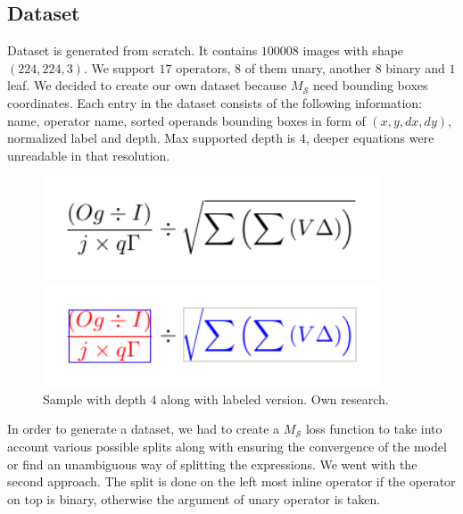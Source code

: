 \documentclass{sciposter}
\begin{document}
\begin{multicols}{3}
\subsection{Dataset}
Dataset is generated from scratch. It contains $100008$ images with shape $(224,224,3)$. We support $17$ operators, $8$ of them unary, another $8$ binary and $1$ leaf. We decided to create our own dataset because $M_{\mathcal{S}}$ need bounding boxes coordinates. Each entry in the dataset consists of the following information: name, operator name, sorted operands bounding boxes in form of $(x,y,dx,dy)$, normalized label and depth. Max supported depth is $4$, deeper equations were unreadable in that resolution.

\begin{figure}[h]
\begin{center}
\includegraphics[width=10cm]{eq85004_b.png}
\end{center}
\begin{center}
\includegraphics[width=10cm]{eq85004_c.png}
\end{center}
\caption{ \label{fig:eigen} Sample with depth $4$ along with labeled version.  Own research.}
\end{figure}

In order to generate a dataset, we had to create a $M_{\mathcal{S}}$ loss function to take into account various possible splits along with ensuring the convergence of the model or find an unambiguous way of splitting the expressions. We went with the second approach. The split is done on the left most inline operator if the operator on top is binary, otherwise the argument of unary operator is taken.


\end{multicols}
\end{document}
